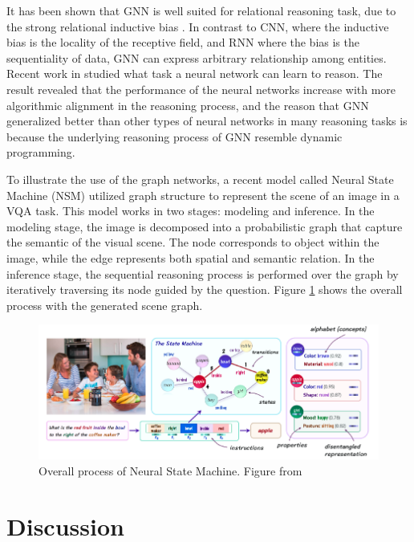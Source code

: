 \documentclass[journal]{IEEEtran}
\begin{document}
It has been shown that GNN is well suited for relational reasoning task, due to the strong relational inductive bias \cite{graphnetworks}.
In contrast to CNN, where the inductive bias is the locality of the receptive field, and RNN where the bias is the sequentiality of data,
GNN can express arbitrary relationship among entities. 
Recent work in \cite{xu2019can} studied what task a neural network can learn to reason. 
The result revealed that the performance of the neural networks increase with more algorithmic alignment in the reasoning process, 
and the reason that GNN generalized better than other types of neural networks in many reasoning tasks is because the underlying reasoning process of GNN resemble dynamic programming.

To illustrate the use of the graph networks, a recent model called Neural State Machine (NSM) \cite{hudson2019learning} utilized graph structure to represent the scene of an image in a VQA task.
This model works in two stages: modeling and inference. 
In the modeling stage, the image is decomposed into a probabilistic graph that capture the semantic of the visual scene.
The node corresponds to object within the image, while the edge represents both spatial and semantic relation.
In the inference stage, the sequential reasoning process is performed over the graph by iteratively traversing its node guided by the question.
Figure \ref{nsm} shows the overall process with the generated scene graph.

\begin{figure}[htb]
  \includegraphics[width=\linewidth]{NSM.png}
  \caption{Overall process of Neural State Machine. Figure from \cite{hudson2019learning}}
  \label{nsm}
\end{figure}

\section{Discussion}
\end{document}
